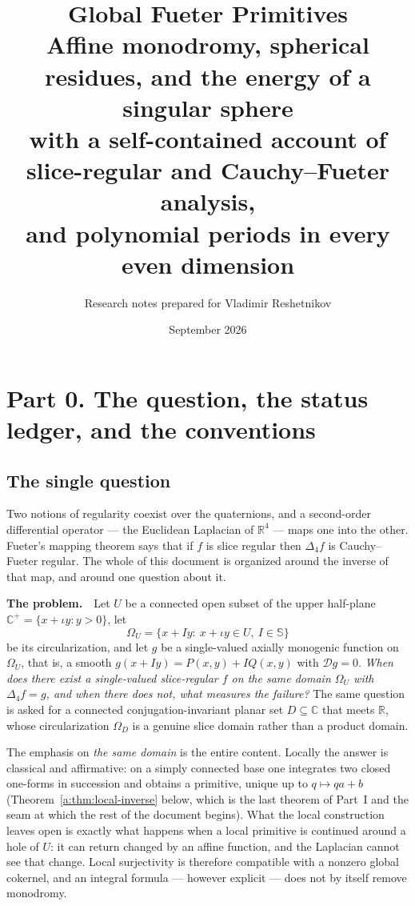 \documentclass[11pt,a4paper]{article}
\title{\textbf{Global Fueter Primitives}\\[4pt]
\large Affine monodromy, spherical residues, and the energy of a singular
sphere\\[2pt]
\normalsize with a self-contained account of slice-regular and
Cauchy--Fueter analysis,\\
and polynomial periods in every even dimension}
\author{Research notes prepared for Vladimir Reshetnikov}
\date{September 2026}
\numberwithin{equation}{section}
\theoremstyle{definition}
\theoremstyle{remark}
\theoremstyle{plain}
\newcommand{\RR}{\mathbb R}
\newcommand{\CC}{\mathbb C}
\newcommand{\SSS}{\mathbb S}
\newcommand{\Cplus}{\CC^{+}}
\newcommand{\Dop}{\mathcal D}
\newcommand{\lap}{\Delta_4}
\newcommand{\Om}{\Omega}
\begin{document}
\maketitle
\setcounter{tocdepth}{2}
\tableofcontents
\clearpage



\section{Part 0. The question, the status ledger, and the conventions}
\label{a:sec:front}

\subsection{The single question}
\label{a:sec:question}

Two notions of regularity coexist over the quaternions, and a second-order
differential operator --- the Euclidean Laplacian of $\RR^4$ --- maps one into
the other. Fueter's mapping theorem says that if $f$ is slice regular then
$\lap f$ is Cauchy--Fueter regular. The whole of this document is organized
around the inverse of that map, and around one question about it.

\medskip
\noindent\textbf{The problem.}\ \ Let $U$ be a connected open subset of the
upper half-plane $\Cplus=\{x+\iota y: y>0\}$, let
\[
 \Om_U=\{x+Iy:\ x+\iota y\in U,\ I\in\SSS\}
\]
be its circularization, and let $g$ be a single-valued axially monogenic
function on $\Om_U$, that is, a smooth $g(x+Iy)=P(x,y)+IQ(x,y)$ with
$\Dop g=0$. \emph{When does there exist a single-valued slice-regular $f$ on
the same domain $\Om_U$ with $\lap f=g$, and when there does not, what
measures the failure?} The same question is asked for a connected
conjugation-invariant planar set $D\subseteq\CC$ that meets $\RR$, whose
circularization $\Om_D$ is a genuine slice domain rather than a product
domain.

\medskip
The emphasis on \emph{the same domain} is the entire content. Locally the
answer is classical and affirmative: on a simply connected base one integrates
two closed one-forms in succession and obtains a primitive, unique up to
$q\mapsto qa+b$ (Theorem~\ref{a:thm:local-inverse} below, which is the last
theorem of Part~I and the seam at which the rest of the document begins).
What the local construction leaves open is exactly what happens when a local
primitive is continued around a hole of $U$: it can return changed by an
affine function, and the Laplacian cannot see that change. Local surjectivity
is therefore compatible with a nonzero global cokernel, and an integral
formula --- however explicit --- does not by itself remove monodromy.
\end{document}
